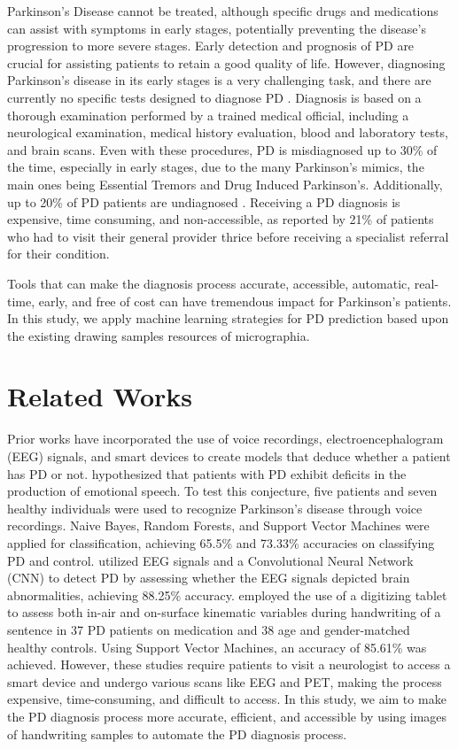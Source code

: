 \documentclass[pmlr,twocolumn,10pt]{jmlr} %
\begin{document}
Parkinson's Disease cannot be treated, although specific drugs and medications can assist with symptoms in early stages, potentially preventing the disease’s progression to more severe stages. Early detection and prognosis of PD are crucial for assisting patients to retain a good quality of life. However, diagnosing Parkinson’s disease in its early stages is a very challenging task, and there are currently no specific tests designed to diagnose PD \citep{national_institute_of_neurological_disorders_and_stroke}. Diagnosis is based on a thorough examination performed by a trained medical official, including a neurological examination, medical history evaluation, blood and laboratory tests, and brain scans. Even with these procedures, PD is misdiagnosed up to 30\% of the time, especially in early stages, due to the many Parkinson’s mimics, the main ones being Essential Tremors and Drug Induced Parkinson’s. Additionally, up to 20\% of PD patients are undiagnosed \citep{schrag_ben-shlomo_quinn_2002}. Receiving a PD diagnosis is expensive, time consuming, and non-accessible, as reported by 21\% of patients who had to visit their general provider thrice before receiving a specialist referral for their condition. \citep{gavidia_2020}

Tools that can make the diagnosis process accurate, accessible, automatic, real-time, early, and free of cost can have tremendous impact for Parkinson’s patients. In this study, we apply machine learning strategies for PD prediction based upon the existing drawing samples resources of micrographia.

\section{Related Works}
\label{related-works}
Prior works have incorporated the use of voice recordings, electroencephalogram (EEG) signals, and smart devices to create models that deduce whether a patient has PD or not. \citep{zhao2014automatic} hypothesized that patients with PD exhibit deficits in the production of emotional speech. To test this conjecture, five patients and seven healthy individuals were used to recognize Parkinson’s disease through voice recordings. Naive Bayes, Random Forests, and Support Vector Machines were applied for classification, achieving 65.5\% and 73.33\% accuracies on classifying PD and control. \citep{oh2020deep} utilized EEG signals and a Convolutional Neural Network (CNN) to detect PD by assessing whether the EEG signals depicted brain abnormalities, achieving 88.25\% accuracy. \citep{drotar2014analysis} employed the use of a digitizing tablet to assess both in-air and on-surface kinematic variables during handwriting of a sentence in 37 PD patients on medication and 38 age and gender-matched healthy controls. Using Support Vector Machines, an accuracy of 85.61\% was achieved. However, these studies require patients to visit a neurologist to access a smart device and undergo various scans like EEG and PET, making the process expensive, time-consuming, and difficult to access. In this study, we aim to make the PD diagnosis process more accurate, efficient, and accessible by using images of handwriting samples to automate the PD diagnosis process. 
\end{document}

